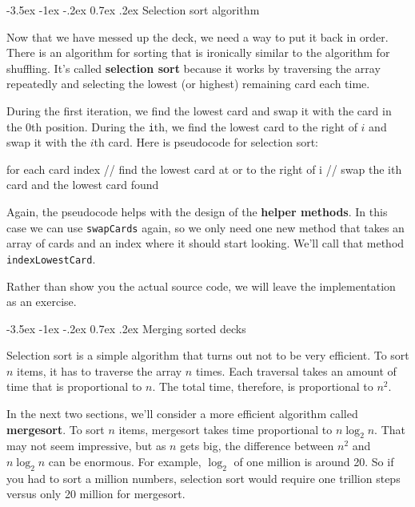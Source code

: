 \documentclass[12pt]{book}
\makeatletter
\theoremstyle{exercise}
\newcommand{\java}[1]{\verb"#1"}
\renewcommand{\section}{\@startsection{section}{1}{\z@}%
    {-3.5ex \@plus -1ex \@minus -.2ex}%
    {0.7ex \@plus.2ex}%
    {\normalfont\Large\bfseries}}
\newcommand{\java}[1]{\lstinline{#1}} %
\makeatother
\begin{document}
\section{Selection sort algorithm}
\label{sorting}


Now that we have messed up the deck, we need a way to put it back in order.
There is an algorithm for sorting that is ironically similar to the algorithm for shuffling.
It's called {\bf selection sort} because it works by traversing the array repeatedly and selecting the lowest (or highest) remaining card each time.

During the first iteration, we find the lowest card and swap it with the card in the 0th position.
During the \java{i}th, we find the lowest card to the right of $i$ and swap it with the $i$th card.
Here is pseudocode for selection sort:

\begin{code}
    for each card index {
        // find the lowest card at or to the right of i
        // swap the ith card and the lowest card found
    }
\end{code}


Again, the pseudocode helps with the design of the {\bf helper methods}.
In this case we can use \java{swapCards} again, so we only need one new method that takes an array of cards and an index where it should start looking.
We'll call that method \java{indexLowestCard}.

Rather than show you the actual source code, we will leave the implementation as an exercise.


\section{Merging sorted decks}
\label{mergesort}


Selection sort is a simple algorithm that turns out not to be very efficient.
To sort $n$ items, it has to traverse the array $n$ times.
Each traversal takes an amount of time that is proportional to $n$.
The total time, therefore, is proportional to $n^2$.

In the next two sections, we'll consider a more efficient algorithm called {\bf mergesort}.
To sort $n$ items, mergesort takes time proportional to $n \log_2 n$.
That may not seem impressive, but as $n$ gets big, the difference between $n^2$ and $n \log_2 n$ can be enormous.
For example, $\log_2$ of one million is around 20.
So if you had to sort a million numbers, selection sort would require one trillion steps versus only 20 million for mergesort.
\end{document}
